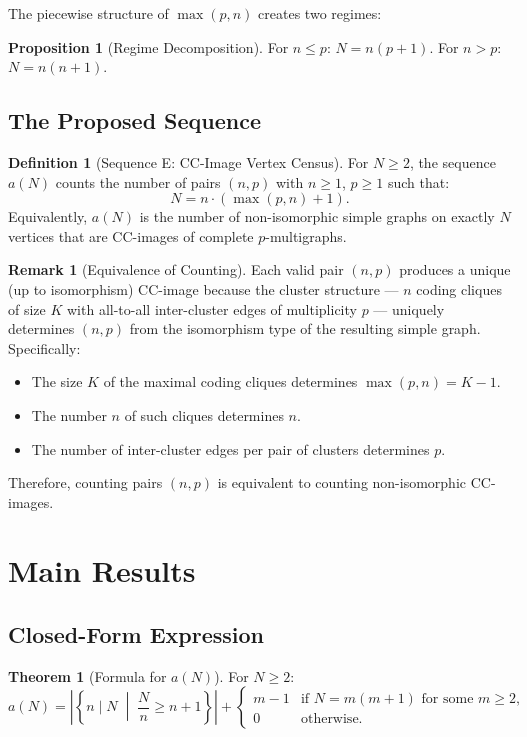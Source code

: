 \documentclass[11pt,a4paper]{article}
\theoremstyle{definition}
\newtheorem{definition}{Definition}[section]
\newtheorem{theorem}{Theorem}[section]
\newtheorem{proposition}{Proposition}[section]
\newtheorem{remark}{Remark}[section]
\begin{document}
The piecewise structure of $\max(p, n)$ creates two regimes:

\begin{proposition}[Regime Decomposition]
\label{prop:regime}
For $n \leq p$: $N = n(p + 1)$. \quad For $n > p$: $N = n(n + 1)$.
\end{proposition}

\subsection{The Proposed Sequence}

\begin{definition}[Sequence E: CC-Image Vertex Census]
For $N \geq 2$, the sequence $a(N)$ counts the number of pairs $(n, p)$ with $n \geq 1$, $p \geq 1$ such that:
\[
N = n \cdot (\max(p, n) + 1).
\]
Equivalently, $a(N)$ is the number of non-isomorphic simple graphs on exactly $N$ vertices that are CC-images of complete $p$-multigraphs.
\end{definition}

\begin{remark}[Equivalence of Counting]
Each valid pair $(n, p)$ produces a unique (up to isomorphism) CC-image because the cluster structure --- $n$ coding cliques of size $K$ with all-to-all inter-cluster edges of multiplicity $p$ --- uniquely determines $(n, p)$ from the isomorphism type of the resulting simple graph. Specifically:
\begin{itemize}
\item The size $K$ of the maximal coding cliques determines $\max(p, n) = K - 1$.
\item The number $n$ of such cliques determines $n$.
\item The number of inter-cluster edges per pair of clusters determines $p$.
\end{itemize}
Therefore, counting pairs $(n, p)$ is equivalent to counting non-isomorphic CC-images.
\end{remark}

\section{Main Results}

\subsection{Closed-Form Expression}

\begin{theorem}[Formula for $a(N)$]
\label{thm:formula}
For $N \geq 2$:
\[
a(N) = \left| \left\{ n \mid N \;\middle|\; \frac{N}{n} \geq n + 1 \right\} \right| + \begin{cases} m - 1 & \text{if } N = m(m+1) \text{ for some } m \geq 2, \\ 0 & \text{otherwise.} \end{cases}
\]
\end{theorem}
\end{document}
